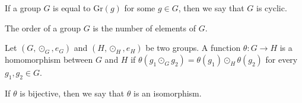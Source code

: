 \begin{definition}
	If a group $G$ is equal to $\text{Gr}(g)$ for some $g \in G$,
	then we say that $G$ is cyclic.
\end{definition}

\begin{definition}
	The order of a group $G$ is the number of elements of $G$.
\end{definition}

\begin{definition}
	Let $(G, \odot_G, e_G)$ and $(H, \odot_H, e_H)$ be two groups. A function
	$\theta:G \to H$ is a homomorphism between $G$ and $H$ if
	$\theta(g_1 \odot_G g_2) = \theta(g_1) \odot_H \theta(g_2)$
	for every $g_1, g_2 \in G$.

	If $\theta$ is bijective, then we say that $\theta$
	is an isomorphism.
\end{definition}
